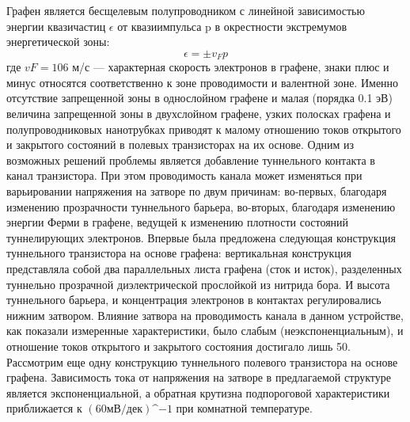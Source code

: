 \documentclass[a4paper,12pt]{article} %
\begin{document}
\noindent Графен является бесщелевым полупроводником с линейной зависимостью энергии квазичастиц $\epsilon$ от квазиимпульса p в окрестности экстремумов энергетической зоны:
$$\epsilon = \pm v_F p$$
\noindent где $vF = 106$ м/с — характерная скорость электронов в графене, знаки плюс и минус относятся соответственно к зоне проводимости и валентной зоне. Именно отсутствие запрещенной зоны в однослойном графене и малая (порядка 0.1 эВ) величина запрещенной зоны в двухслойном графене, узких полосках графена и полупроводниковых нанотрубках приводят к малому отношению токов открытого и закрытого состояний в полевых транзисторах на их основе. Одним из возможных решений проблемы является добавление туннельного контакта в канал транзистора. При этом проводимость канала может изменяться при варьировании напряжения на затворе по двум причинам: во-первых, благодаря изменению прозрачности туннельного барьера, во-вторых, благодаря изменению энергии Ферми в графене, ведущей к изменению плотности состояний туннелирующих электронов. Впервые была предложена следующая конструкция туннельного транзистора на основе графена: вертикальная конструкция представляла собой два параллельных листа графена (сток и исток), разделенных туннельно прозрачной диэлектрической прослойкой из нитрида бора. И высота туннельного барьера, и концентрация электронов в контактах регулировались нижним затвором. Влияние затвора на проводимость канала в данном устройстве, как показали измеренные характеристики, было слабым (неэкспоненциальным), и отношение токов открытого и закрытого состояния достигало лишь 50. Рассмотрим еще одну конструкцию туннельного полевого транзистора на основе графена. Зависимость тока от напряжения на затворе в предлагаемой структуре является экспоненциальной, а обратная крутизна подпороговой характеристики приближается к $(60 \text{мВ/дек}) \^{−1}$ при комнатной температуре.
\end{document}
